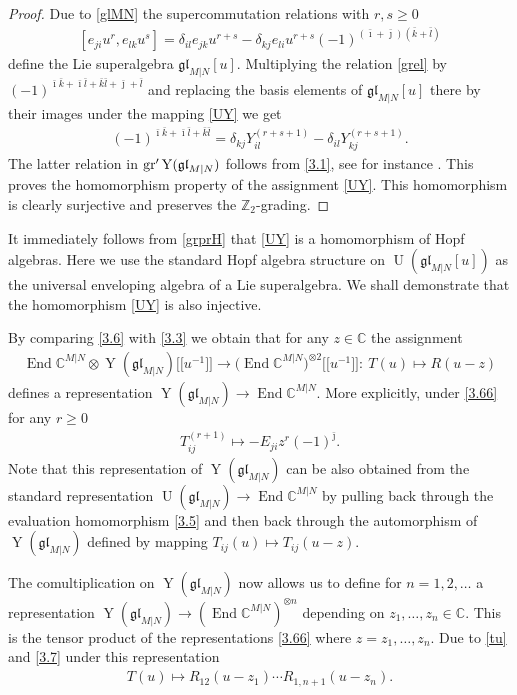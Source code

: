 \documentclass[10pt,a4paper]{amsart}
\numberwithin{equation}{section}
\def\bi{{\bar\imath }}
\def\bj{{\bar\jmath }}
\def\bk{{\bar k }}
\def\bl{{\bar l }}
\def\CC{{\mathbb{C}}}
\def\CMN{\CC^{M|N}}
\def\de{\delta}
\def\End{\operatorname{End}}
\def\g{\glMN [u]}
\def\ge{\geqslant}
\def\glMN{\mathfrak{gl}_{M|N}}
\def\grpr{{\rm gr}^{\prime} }
\def\ot{\otimes}
\def\UMN{\operatorname{U}(\glMN)}
\def\Ug{\operatorname{U}(\g)}
\def\YMN{\operatorname{Y}(\glMN)}
\def\ZZ{\mathbb{Z}}
\begin{document}
\begin{proof}
Due to \eqref{glMN} the supercommutation relations with $r ,s\ge0$
\begin{gather}
\label{grel}
[ e_{ji} u^{r}, e_{lk} u^{s} ]=
\de_{il} e_{jk} u^{r+s}-
\de_{kj} e_{li} u^{r+s}
{(-1)}^{( \bi+ \bj )( \bk+ \bl )}
\end{gather}
define the Lie superalgebra $\g $.
Multiplying the relation \eqref{grel} by
$(-1)^{\bi \bk + \bi \bl + \bk \bl+\bj+\bl}$
and replacing the basis elements of $\g$ there by their images
under the mapping \eqref{UY} we get
\begin{gather*}
[ Y_{ij}^{(r+1)},Y_{kl}^{(s+1)} \bigr]
(-1)^{\bi \bk + \bi \bl + \bk \bl}=
\de_{kj} Y_{il}^{(r+s+1)}-\de_{il} Y_{kj}^{(r+s+1)} .
\end{gather*}
The latter relation in $\grpr\YMN$ follows from \eqref{3.1},
see for instance \cite[Section 1]{MNO}.
This proves the homomorphism property of the assignment \eqref{UY}.
This homomorphism is clearly surjective
and preserves the $\ZZ_{2}$-grading.
\end{proof}

It immediately follows from \eqref{grprH} that
\eqref{UY} is a homomorphism of Hopf algebras.
Here we use the standard Hopf algebra structure on $\Ug$
as the universal enveloping algebra of a Lie superalgebra.
We shall demonstrate that the homomorphism \eqref{UY} is also injective.

By comparing \eqref{3.6} with \eqref{3.3}
we obtain that for any $z\in\CC$ the assignment
\begin{gather}\label{3.66}
\End\CMN\ot\YMN \big[\big[u^{-1}\big]\big]
\to
\big(\End\CMN\big)^{\ot 2} \big[\big[u^{-1}\big]\big]\colon \
T(u)\mapsto R(u-z)
\end{gather}
defines a representation $\YMN\to\End\CMN$. More explicitly, under
\eqref{3.66} for any $r\ge0$
\begin{gather}
\label{2.19}
T_{ij}^{(r+1)}\mapsto
- E_{ji} z^{r} {(-1)}^{\bj} .
\end{gather}
Note that this representation of $\YMN$
can be also obtained from the standard representation $\UMN\to\End\CMN$
by pulling back through the evaluation homomorphism \eqref{3.5}
and then back through the automorphism of $\YMN$ defined by mapping
$
T_{ij}(u)\mapsto T_{ij}(u-z) .
$

The comultiplication on $\YMN$
now allows us to define for $n=1 ,2 , \dots$ a representation
$\YMN\to(\End\CMN)^{\ot n}$ depending on
$z_1,\dots, z_n\in\CC $. This is the tensor product of
the representations \eqref{3.66} where $z=z_1,\dots, z_n $.
Due to \eqref{tu} and \eqref{3.7} under this representation
\begin{gather}\label{3.666}
T(u)\mapsto R_{12}(u-z_1) \cdots R_{1,n+1}(u-z_n) .
\end{gather}
\end{document}
